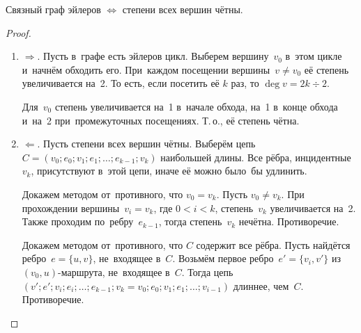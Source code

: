 \begin{theorem}
Связный граф эйлеров $\Leftrightarrow$ степени всех вершин чётны.
\end{theorem}
\begin{proof}
\begin{enumerate}
	\item $\Rightarrow$. Пусть в~графе есть эйлеров цикл.
	Выберем вершину~$v_0$ в~этом цикле и~начнём обходить его.
	При~каждом посещении вершины~$v \neq v_0$ её степень увеличивается на~2.
	То есть, если посетить её $k$ раз, то $\deg v = 2k \div 2$.
	
	Для~$v_0$ степень увеличивается на~1 в~начале обхода, на~1 в~конце обхода и~на~2 при~промежуточных посещениях.
	Т.\,о., её степень чётна.
	
	\item $\Leftarrow$. Пусть степени всех вершин чётны.
	Выберём цепь~$C = (v_0; e_0; v_1; e_1; \ldots; e_{k-1}; v_k)$ наибольшей длины.
	Все рёбра, инцидентные~$v_k$, присутствуют в~этой цепи, иначе её можно было~бы удлинить.
	
	Докажем методом от~противного, что $v_0 = v_k$.
	Пусть $v_0 \neq v_k$.
	При прохождении вершины~$v_i = v_k$, где $0 < i < k$, степень~$v_k$ увеличивается на~2.
	Также проходим по~ребру~$e_{k-1}$, тогда степень~$v_k$ нечётна.
	Противоречие.
	
	Докажем методом от~противного, что $C$ содержит все рёбра.	
	Пусть найдётся ребро~$e = \{ u, v \}$, не~входящее в~$C$.
	Возьмём первое ребро~$e' = \{ v_i, v' \}$ из~$(v_0, u)$\nobreakdash-\hspace{0pt}маршрута, не~входящее в~$C$.
	Тогда цепь~$(v'; e'; v_i; e_i; \ldots; e_{k-1}; v_k = v_0; e_0; v_1; e_1; \ldots; v_{i-1})$ длиннее, чем~$C$.
	Противоречие.
\end{enumerate}
\end{proof}

